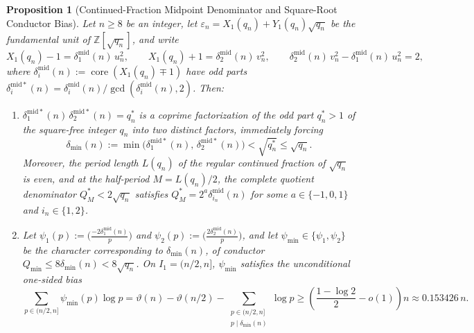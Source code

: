 \documentclass[11pt,reqno]{amsart}
\newtheorem{proposition}[theorem]{Proposition}
\theoremstyle{remark}
\numberwithin{equation}{section}
\newcommand{\Z}{\mathbb{Z}}
\DeclareMathOperator{\core}{core}
\begin{document}
\begin{proposition}[{Continued-Fraction Midpoint Denominator and Square-Root Conductor Bias}]\label{prop:5.1}
Let $n \ge 8$ be an integer, let $\varepsilon_n = X_1(q_n) + Y_1(q_n)\sqrt{q_n}$ be the fundamental unit of $\Z[\sqrt{q_n}]$, and write
\begin{equation}\label{eq:5.1}
X_1(q_n) - 1 = \delta_1^{\mathrm{mid}}(n)\,u_n^2, \qquad X_1(q_n) + 1 = \delta_2^{\mathrm{mid}}(n)\,v_n^2, \qquad \delta_2^{\mathrm{mid}}(n)\,v_n^2 - \delta_1^{\mathrm{mid}}(n)\,u_n^2 = 2,
\end{equation}
where $\delta_i^{\mathrm{mid}}(n) := \core(X_1(q_n) \mp 1)$ have odd parts $\delta_i^{\mathrm{mid}*}(n) = \delta_i^{\mathrm{mid}}(n)/\gcd(\delta_i^{\mathrm{mid}}(n), 2)$. Then:
\begin{enumerate}
\item[(i)] $\delta_1^{\mathrm{mid}*}(n)\,\delta_2^{\mathrm{mid}*}(n) = q_n^*$ is a coprime factorization of the odd part $q_n^* > 1$ of the square-free integer $q_n$ into two distinct factors, immediately forcing
\begin{equation}\label{eq:5.2}
\delta_{\min}(n) := \min\bigl(\delta_1^{\mathrm{mid}*}(n),\, \delta_2^{\mathrm{mid}*}(n)\bigr) < \sqrt{q_n^*} \le \sqrt{q_n}.
\end{equation}
Moreover, the period length $L(q_n)$ of the regular continued fraction of $\sqrt{q_n}$ is even, and at the half-period $M = L(q_n)/2$, the complete quotient denominator $Q_M^* < 2\sqrt{q_n}$ satisfies $Q_M^* = 2^a \delta_{i_n}^{\mathrm{mid}}(n)$ for some $a \in \{-1, 0, 1\}$ and $i_n \in \{1, 2\}$.
\item[(ii)] Let $\psi_1(p) := \bigl(\frac{-2\delta_1^{\mathrm{mid}}(n)}{p}\bigr)$ and $\psi_2(p) := \bigl(\frac{2\delta_2^{\mathrm{mid}}(n)}{p}\bigr)$, and let $\psi_{\min} \in \{\psi_1, \psi_2\}$ be the character corresponding to $\delta_{\min}(n)$, of conductor $Q_{\min} \le 8\delta_{\min}(n) < 8\sqrt{q_n}$. On $I_1 = (n/2, n]$, $\psi_{\min}$ satisfies the unconditional one-sided bias
\begin{equation}\label{eq:5.3}
\sum_{p \in (n/2, n]} \psi_{\min}(p)\log p = \vartheta(n) - \vartheta(n/2) - \sum_{\substack{p \in (n/2, n] \\ p \mid \delta_{\min}(n)}} \log p \ge \left(\frac{1 - \log 2}{2} - o(1)\right)n \approx 0.153426\,n.
\end{equation}
\end{enumerate}
\end{proposition}
\end{document}
